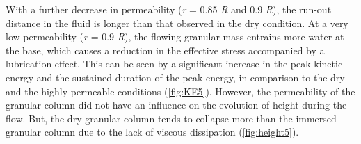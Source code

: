 \documentclass[12pt,twoside]{tuhhproc-en}
\begin{document}
With a further decrease in permeability (\textit{r} = 0.85 \textit{R} and 0.9 
\textit{R}), the run-out 
distance in the fluid is longer than that observed in the dry 
condition. At a very low permeability (\textit{r} = 0.9 \textit{R}), the 
flowing granular mass
entrains more water at the base, which causes a reduction in the effective 
stress accompanied by a lubrication effect. This can be seen by a significant 
increase in the peak kinetic energy and the sustained duration of the peak 
energy, in comparison to the dry and the highly permeable conditions 
(\cref{fig:KE5}). However, the permeability of the granular column did not have 
an influence on the evolution of height during the flow. But, the dry granular 
column tends to collapse more than the immersed granular column due to the lack 
of viscous dissipation (\cref{fig:height5}).
\end{document}
